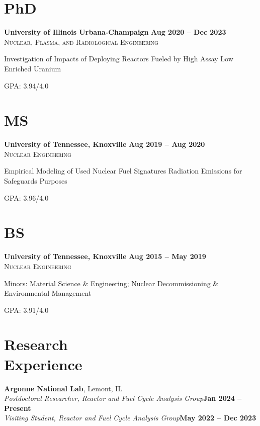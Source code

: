 \documentclass[margin,line]{resume}
\begin{document}
\begin{resume}
    \section{\mysidestyle PhD}
    \textbf{University of Illinois Urbana-Champaign} \hfill \textbf{Aug 2020 -- Dec 2023}\\%
    \textsc{Nuclear, Plasma, and Radiological Engineering}\hfill
    \begin{list2}
        \item Investigation of Impacts of Deploying Reactors Fueled by High 
        Assay Low Enriched Uranium
        \item GPA: 3.94/4.0
    \end{list2}\vspace{-4mm}
    
    \section{\mysidestyle MS}
    \textbf{University of Tennessee, Knoxville} \hfill\textbf{Aug 2019 -- Aug 2020}\\%
    \textsc{Nuclear Engineering}\hfill
    \begin{list2}
        \item Empirical Modeling of Used Nuclear Fuel Signatures Radiation Emissions for Safeguards Purposes
        \item GPA: 3.96/4.0
    \end{list2}\vspace{-4mm}
    \section{\mysidestyle BS}
    \textbf{University of Tennessee, Knoxville} \hfill\textbf{Aug 2015 -- May 2019}\\%
    \textsc{Nuclear Engineering}\hfill
    \begin{list2}
        \item Minors: Material Science \& Engineering; Nuclear Decommissioning \& 
              Environmental Management
        \item GPA: 3.91/4.0
    \end{list2}\vspace{-5mm}
    
    \section{\mysidestyle Research\\Experience}
    \textbf{Argonne National Lab}, Lemont, IL\\
    \vspace{0mm}
        \textsl{Postdoctoral Researcher, Reactor and Fuel Cycle Analysis Group}\hfill\textbf{Jan 2024 -- Present}\\\vspace{-2mm}
        \textsl{Visiting Student, Reactor and Fuel Cycle Analysis Group}\hfill\textbf{May 2022 -- Dec 2023}\\\vspace{-6mm}


\end{resume}
\end{document}
